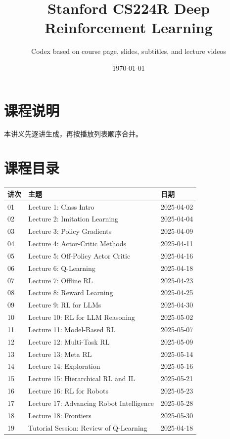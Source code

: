\documentclass[a4paper]{article}
\title{Stanford CS224R Deep Reinforcement Learning}
\author{Codex based on course page, slides, subtitles, and lecture videos}
\date{\today}
\begin{document}
\maketitle
\tableofcontents
\newpage
\section*{课程说明}
本讲义先逐讲生成，再按播放列表顺序合并。
\section*{课程目录}
\begin{longtable}{p{}p{}p{}}
\textbf{讲次} & \textbf{主题} & \textbf{日期}\\
\hline
01 & Lecture 1: Class Intro & 2025-04-02\\
02 & Lecture 2: Imitation Learning & 2025-04-04\\
03 & Lecture 3: Policy Gradients & 2025-04-09\\
04 & Lecture 4: Actor-Critic Methods & 2025-04-11\\
05 & Lecture 5: Off-Policy Actor Critic & 2025-04-16\\
06 & Lecture 6: Q-Learning & 2025-04-18\\
07 & Lecture 7: Offline RL & 2025-04-23\\
08 & Lecture 8: Reward Learning & 2025-04-25\\
09 & Lecture 9: RL for LLMs & 2025-04-30\\
10 & Lecture 10: RL for LLM Reasoning & 2025-05-02\\
11 & Lecture 11: Model-Based RL & 2025-05-07\\
12 & Lecture 12: Multi-Task RL & 2025-05-09\\
13 & Lecture 13: Meta RL & 2025-05-14\\
14 & Lecture 14: Exploration & 2025-05-16\\
15 & Lecture 15: Hierarchical RL and IL & 2025-05-21\\
16 & Lecture 16: RL for Robots & 2025-05-23\\
17 & Lecture 17: Advancing Robot Intelligence & 2025-05-28\\
18 & Lecture 18: Frontiers & 2025-05-30\\
19 & Tutorial Session: Review of Q-Learning & 2025-04-18\\
\end{longtable}
\end{document}
